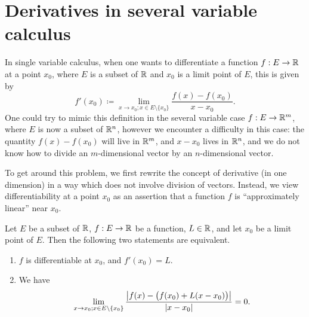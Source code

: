 \section{Derivatives in several variable calculus}\label{sec:6.2}

\begin{note}
  In single variable calculus, when one wants to differentiate a function \(f : E \to \mathbb{R}\) at a point \(x_0\), where \(E\) is a subset of \(\mathbb{R}\) and \(x_0\) is a limit point of \(E\), this is given by
  \[
    f'(x_0) \coloneqq \lim_{x \to x_0 ; x \in E \setminus \{x_0\}} \dfrac{f(x) - f(x_0)}{x - x_0}.
  \]
  One could try to mimic this definition in the several variable case \(f : E \to \mathbb{R}^m\), where \(E\) is now a subset of \(\mathbb{R}^n\), however we encounter a difficulty in this case:
  the quantity \(f(x) - f(x_0)\) will live in \(\mathbb{R}^m\), and \(x - x_0\) lives in \(\mathbb{R}^n\), and we do not know how to divide an \(m\)-dimensional vector by an \(n\)-dimensional vector.

  To get around this problem, we first rewrite the concept of derivative (in one dimension) in a way which does not involve division of vectors.
  Instead, we view differentiability at a point \(x_0\) as an assertion that a function \(f\) is ``approximately linear'' near \(x_0\).
\end{note}

\begin{lem}\label{6.2.1}
  Let \(E\) be a subset of \(\mathbb{R}\), \(f : E \to \mathbb{R}\) be a function, \(L \in \mathbb{R}\), and let \(x_0\) be a limit point of \(E\).
  Then the following two statements are equivalent.
  \begin{enumerate}
    \item \(f\) is differentiable at \(x_0\), and \(f'(x_0) = L\).
    \item We have
          \[
            \lim_{x \to x_0 ; x \in E \setminus \{x_0\}} \dfrac{\left\lvert f(x) - \big(f(x_0) + L (x - x_0)\big)\right\rvert}{\left\lvert x - x_0\right\rvert} = 0.
          \]
  \end{enumerate}
\end{lem}

